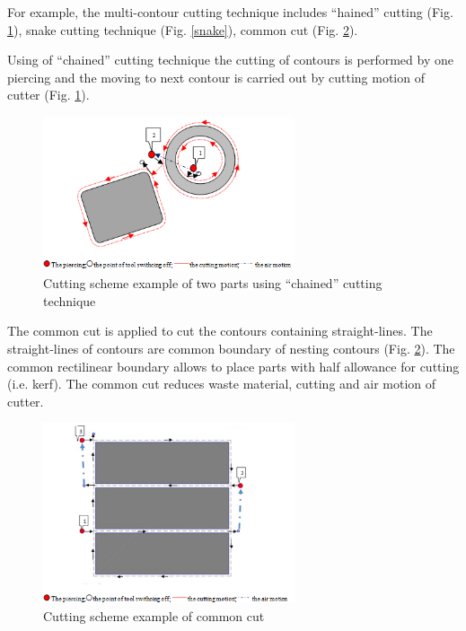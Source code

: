 \documentclass[runningheads]{llncs}
\begin{document}
For example, the multi-contour cutting technique includes ``hained'' cutting
(Fig. \ref{chain}),
snake cutting technique (Fig. \ref{snake}),
common cut (Fig. \ref{common}).

Using of ``chained'' cutting technique
the cutting of contours is performed by one piercing
and the moving to next contour is carried out by cutting motion of cutter
(Fig. \ref{chain}).

\begin{figure}
  \begin{center}
  \includegraphics[width=0.66\textwidth]{chain.png}
  \caption{Cutting scheme example of two parts using ``chained'' cutting technique}
  \label{chain}
  \end{center}
\end{figure}

The common cut is applied to cut the contours containing straight-lines.
The straight-lines of contours are common boundary of nesting contours (Fig. \ref{common}).
The common rectilinear boundary allows to place parts with half allowance for cutting
(i.e. kerf).
The common cut reduces waste material,
cutting and air motion of cutter.

\begin{figure}
  \begin{center}
  \includegraphics[width=0.66\textwidth]{common.png}
  \caption{Cutting scheme example of common cut}
  \label{common}
  \end{center}
\end{figure}
\end{document}
